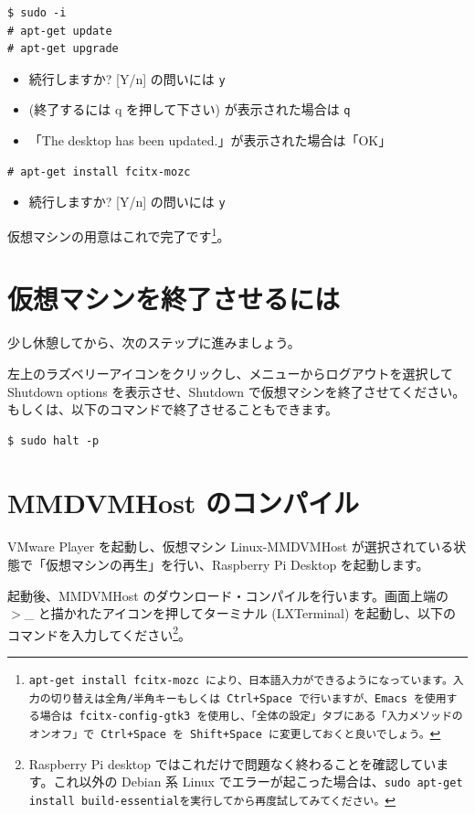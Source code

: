 \documentclass[a4j,oneside]{ujbook}
\begin{document}
\begin{verbatim}
$ sudo -i
# apt-get update
# apt-get upgrade
\end{verbatim}
\begin{itemize}
 \renewcommand{\labelitemi}{$\triangleright$}
 \item 続行しますか? [Y/n] の問いには \verb+y+
 \item (終了するには q を押して下さい) が表示された場合は \verb+q+
 \item 「The desktop has been updated.」が表示された場合は「OK」
\end{itemize}
\begin{verbatim}
# apt-get install fcitx-mozc
\end{verbatim}
\begin{itemize}
 \renewcommand{\labelitemi}{$\triangleright$}
 \item 続行しますか? [Y/n] の問いには \verb+y+
\end{itemize}

仮想マシンの用意はこれで完了です\footnote{\tt{apt-get install fcitx-mozc} により、日本語入力ができるようになっています。入力の切り替えは全角/半角キーもしくは Ctrl+Space で行いますが、Emacs を使用する場合は \tt{fcitx-config-gtk3} を使用し、「全体の設定」タブにある「入力メソッドのオンオフ」で Ctrl+Space を Shift+Space に変更しておくと良いでしょう。}。

\section{仮想マシンを終了させるには}
少し休憩してから、次のステップに進みましょう。

左上のラズベリーアイコンをクリックし、メニューからログアウトを選択して Shutdown options を表示させ、Shutdown で仮想マシンを終了させてください。もしくは、以下のコマンドで終了させることもできます。

\begin{verbatim}
$ sudo halt -p
\end{verbatim}

\section{MMDVMHost のコンパイル}

VMware Player を起動し、仮想マシン Linux-MMDVMHost が選択されている状態で「仮想マシンの再生」を行い、Raspberry Pi Desktop を起動します。

起動後、MMDVMHost のダウンロード・コンパイルを行います。画面上端の $>$\_ と描かれたアイコンを押してターミナル (LXTerminal) を起動し、以下のコマンドを入力してください\footnote{Raspberry Pi desktop ではこれだけで問題なく終わることを確認しています。これ以外の Debian 系 Linux でエラーが起こった場合は、\tt{sudo apt-get install build-essential}を実行してから再度試してみてください。}。
\end{document}
